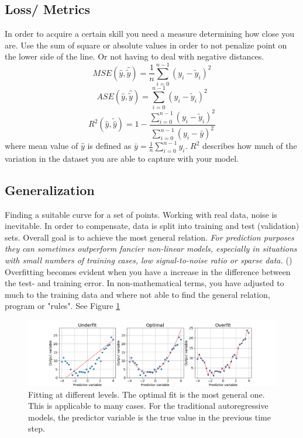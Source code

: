 \subsection{Loss/ Metrics}  \label{sec:metrics}
In order to acquire a certain skill you need a measure determining how close you are. 
Use the sum of square or absolute values in order to not penalize point on the lower side of the line. Or not having to deal with negative distances. 
\begin{equation} \label{eq:mse}
    MSE(\hat{y},\hat{\tilde{y}}) = \frac{1}{n} \sum_{i=0}^{n-1}(y_i-\tilde{y}_i)^2
\end{equation} 
\begin{equation} \label{eq:ase}
    ASE(\hat{y},\hat{\tilde{y}}) =  \sum_{i=0}^{n-1}(y_i-\tilde{y}_i)^2
\end{equation} 
\begin{equation} \label{eq:r2}
    R^2(\hat{y}, \tilde{\hat{y}}) = 1 - \frac{\sum_{i=0}^{n - 1} (y_i - \tilde{y}_i)^2}{\sum_{i=0}^{n - 1} (y_i - \bar{y})^2}
\end{equation} 
where mean value of $\hat{y}$ is defined as $\bar{y} =  \frac{1}{n} \sum_{i=0}^{n - 1} y_i$. $R^2$ describes how much of the variation in the dataset you are able to capture with your model.

\subsection{Generalization} \label{sec:generalization}
Finding a suitable curve for a set of points. Working with real data, noise is inevitable. In order to compensate, data is split into training and test (validation) sets. %
Overall goal is to achieve the most general relation. \textit{For prediction purposes they can sometimes outperform fancier non-linear models, especially in situations with small numbers of training cases, low signal-to-noise ratio or sparse data.} (\cite{hastie_statistical-learning}) Overfitting becomes evident when you have a increase in the difference between the test- and training error. In non-mathematical terms, you have adjusted to much to the training data and where not able to find the general relation, program or "rules". See Figure \ref{fig:linreg_overfitting} 

\begin{figure}[hp]
    \centering
    \includegraphics[scale = 0.4]{Chapter3_Method/figs/generalization.png}
    \caption{Fitting at different levels. The optimal fit is the most general one. This is applicable to many cases. For the traditional autoregressive models, the predictor variable is the true value in the previous time step. }
    \label{fig:linreg_overfitting}
\end{figure}

